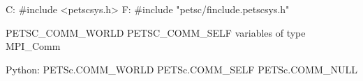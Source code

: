 C:
#include <petscsys.h>
F:
#include "petsc/finclude.petscsys.h"

PETSC_COMM_WORLD
PETSC_COMM_SELF
variables of type MPI_Comm

Python:
PETSc.COMM_WORLD
PETSc.COMM_SELF
PETSc.COMM_NULL
